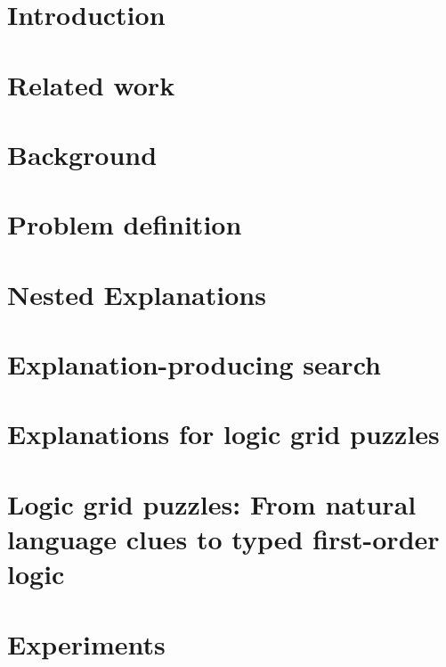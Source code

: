 \documentclass[3p]{elsarticle}
\begin{document}
\linenumbers

\section{Introduction}\label{sec:intro}


\section{Related work}\label{sec:related-work}


\section{Background}\label{sec:background}\label{sec:prelims}


\section{Problem definition}\label{sec:problem-definition}


\section{Nested Explanations}\label{sec:nested-explanation}


\section{Explanation-producing search}\label{sec:expl-gen-prod}



\section{Explanations for logic grid puzzles}\label{sec:zebra}


\section{Logic grid puzzles: From natural language clues to typed first-order logic}\label{sec:holistic}


\section{Experiments}\label{sec:experiments}

\end{document}
